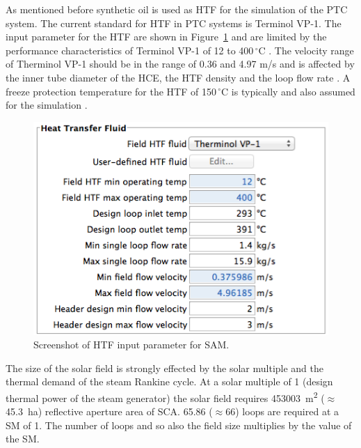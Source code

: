 As mentioned before synthetic oil is used as HTF for the simulation of the PTC system. The current standard for HTF in PTC systems is Terminol VP-1. The input parameter for the HTF are shown in Figure~\ref{PTC_HTF} and are limited by the performance characteristics of Terminol VP-1 of 12 to 400$\,^{\circ}\mathrm{C}$ \cite{Therminol2015}. The velocity range of Therminol VP-1 should be in the range of 0.36 and 4.97 m/s \cite{Wagner2014} and is affected by the inner tube diameter of the HCE, the HTF density and the loop flow rate \cite{NREL2015a}. A freeze protection temperature for the HTF of 150$\,^{\circ}\mathrm{C}$ is typically and also assumed for the simulation \cite{Kearney2002}.
\begin{figure}[htbp]  
\centering
\includegraphics[width=0.6\linewidth]{FIG/PTC_HTF}
\caption[Screenshot of HTF input parameter for SAM.]{Screenshot of HTF input parameter for SAM.}\label{PTC_HTF}
\end{figure}


The size of the solar field is strongly effected by the solar multiple and the thermal demand of the steam Rankine cycle. At a solar multiple of 1 (design thermal power of the steam generator) the solar field requires 453003~m\textsuperscript{2} ($\approx$45.3~ha) reflective aperture area of SCA. 65.86 ($\approx$66) loops are required at a SM of 1. The number of loops and so also the field size multiplies by the value of the SM.



